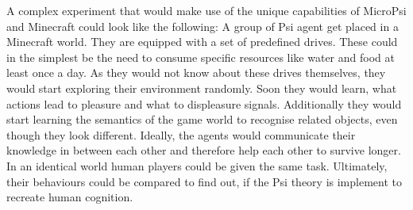 A complex experiment that would make use of the unique capabilities of MicroPsi and Minecraft could look like the following:
A group of Psi agent get placed in a Minecraft world. They are equipped with a set of predefined drives. These could in the simplest be the need to consume specific resources like water and food at least once a day. As they would not know about these drives themselves, they would start exploring their environment randomly. Soon they would learn, what actions lead to pleasure and what to displeasure signals. Additionally they would start learning the semantics of the game world to recognise related objects, even though they look different. Ideally, the agents would communicate their knowledge in between each other and therefore help each other to survive longer. In an identical world human players could be given the same task. Ultimately, their behaviours could be compared to find out, if the Psi theory is implement to recreate human cognition.